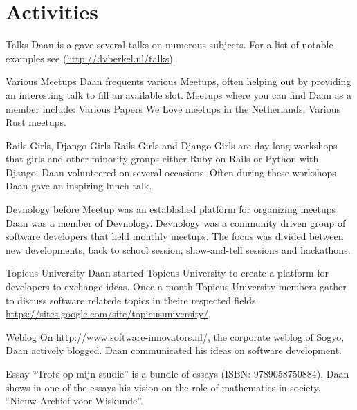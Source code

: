 \section*{Activities}

	\begin{subActivityList}
  \item[Talks] Daan is a gave several talks on numerous
    subjects. For a list of notable examples see
    (\url{http://dvberkel.nl/talks}).

    \item[Various Meetups] Daan frequents various Meetups, often helping out by
      providing an interesting talk to fill an available slot. Meetups where you
      can find Daan as a member include: Various Papers We Love meetups in the
      Netherlands, Various Rust meetups.

    \item[Rails Girls, Django Girls] Rails Girls and Django Girls are day long
      workshops that girls and other minority groups either Ruby on Rails or
      Python with Django. Daan volunteered on several occasions. Often during
      these workshops Daan gave an inspiring lunch talk.

    \item[Devnology] before Meetup was an established platform for organizing
      meetups Daan was a member of Devnology. Devnology was a community driven
      group of software developers that held monthly meetups. The focus was
      divided between new developments, back to school session, show-and-tell
      sessions and hackathons.

		\item[Topicus University] Daan started Topicus
                  University to create a platform for developers to
                  exchange ideas. Once a month Topicus University
                  members gather to discuss software relatede topics
                  in theire respected fields. 
		\url{https://sites.google.com/site/topicusuniversity/}.\hfill\\
	
		\item[Weblog] On \url{http://www.software-innovators.nl/}, the corporate
		weblog of Sogyo, Daan actively blogged. Daan
                communicated his ideas on software development.
		\hfill\\
		
		\item[Essay] ``Trots op mijn studie'' is a bundle of
                  essays (ISBN: 9789058750884). Daan shows in one of
                  the essays his vision on the role of mathematics in society.
		``Nieuw Archief voor Wiskunde''.		
		\hfill\\
	\end{subActivityList}
